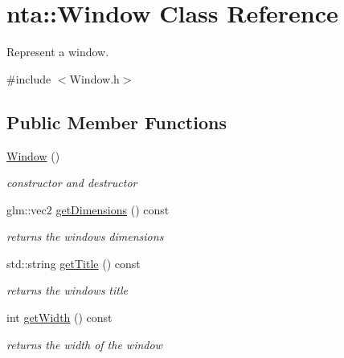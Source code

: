 \hypertarget{classnta_1_1Window}{}\section{nta\+:\+:Window Class Reference}
\label{classnta_1_1Window}


Represent a window.  




{\ttfamily \#include $<$Window.\+h$>$}

\subsection*{Public Member Functions}
\begin{DoxyCompactItemize}
\item 
\mbox{\label{classnta_1_1Window_a28534e4bb354c4b38b1d97aed78fd010}} 
\hyperlink{classnta_1_1Window_a28534e4bb354c4b38b1d97aed78fd010}{Window} ()
\begin{DoxyCompactList}\small\item\em constructor and destructor \end{DoxyCompactList}\item 
\mbox{\label{classnta_1_1Window_a461977bc0033732836ec56615ca0aa83}} 
glm\+::vec2 \hyperlink{classnta_1_1Window_a461977bc0033732836ec56615ca0aa83}{get\+Dimensions} () const
\begin{DoxyCompactList}\small\item\em returns the window\textquotesingle{}s dimensions \end{DoxyCompactList}\item 
\mbox{\label{classnta_1_1Window_a91f2eeac996c2f863b92601f8bb459aa}} 
std\+::string \hyperlink{classnta_1_1Window_a91f2eeac996c2f863b92601f8bb459aa}{get\+Title} () const
\begin{DoxyCompactList}\small\item\em returns the window\textquotesingle{}s title \end{DoxyCompactList}\item 
\mbox{\label{classnta_1_1Window_ac6cb1a31bb8c219e189ca5f88e25dd45}} 
int \hyperlink{classnta_1_1Window_ac6cb1a31bb8c219e189ca5f88e25dd45}{get\+Width} () const
\begin{DoxyCompactList}\small\item\em returns the width of the window \end{DoxyCompactList}\item 

\end{DoxyCompactItemize}
